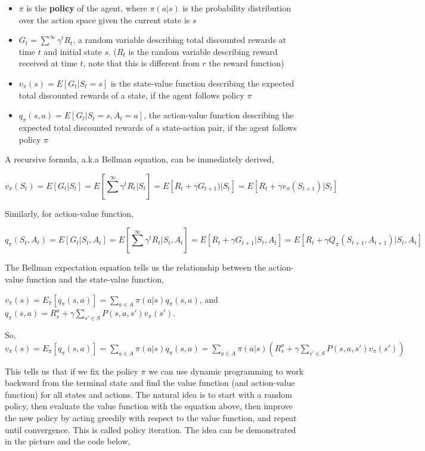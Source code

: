 \documentclass[graybox]{svmult}
\begin{document}
\begin{itemize}
\item $\pi$ is the \textbf{policy} of the agent, where $\pi(a | s)$ is the probability distribution over the action space given the current state is $s$
\item $G_t = \sum^{\infty} \gamma^t R_t $, a random variable describing total discounted rewards at time $t$ and initial state $s$. ($R_t$ is the random variable describing reward received at time $t$, note that this is different from $r$ the reward function)
\item $v_{\pi}(s) = E[ G_t | S_t = s ]$ is the state-value function describing the expected total discounted rewards of a state, if the agent follows policy $\pi$
\item $q_{\pi}(s, a) = E[G_t| S_t = s, A_t = a ]$, the action-value function describing the expected total discounted rewards of a state-action pair, if the agent follows policy $\pi$
\end{itemize}

A recursive formula, a.k.a Bellman equation, can be immediately derived,

\[
v_{\pi}(S_t) = E[G_t | S_t ] = E[\sum^{\infty} \gamma^t R_t | S_t  ] 
                      = E[R_t + \gamma G_{t+1}) | S_t ] 
                      = E[R_t + \gamma v_{\pi}(S_{t+1}) | S_t ]
\]

Similarly, for action-value function,

\[
q_{\pi}(S_t, A_t) = E[G_t | S_t, A_t] = E[\sum^{\infty} \gamma^t R_t | S_t, A_t] 
                      = E[R_t + \gamma G_{t+1} | S_t, A_t] 
                      = E[R_t + \gamma Q_{\pi}(S_{t+1}, A_{t+1}) | S_t, A_t]
\]

The Bellman expectation equation tells us the relationship between the action-value function and the state-value function,

$v_{\pi}(s) = E_{\pi}[q_{\pi}(s, a) ] = \sum_{a \in A}  \pi (a | s) q_{\pi}(s, a) $, and $q_{\pi}(s, a) = R^{a}_{s} + \gamma \sum_{s' \in S} P(s, a, s') v_{\pi}(s')$. 

So, $v_{\pi}(s) = E_{\pi}[q_{\pi}(s, a) ] = \sum_{a \in A}  \pi (a | s) q_{\pi}(s, a) =  \sum_{a \in A}  \pi (a | s) (R^{a}_{s} + \gamma \sum_{s' \in S} P(s, a, s') v_{\pi}(s'))$

This tells us that if we fix the policy $\pi$ we can use dynamic programming to work backward from the terminal state and find the value function (and action-value function) for all states and actions. The natural idea is to start with a random policy, then evaluate the value function with the equation above, then improve the new policy by acting greedily with respect to the value function, and repeat until convergence. This is called policy iteration. The idea can be demonstrated in the picture and the code below,
\end{document}
